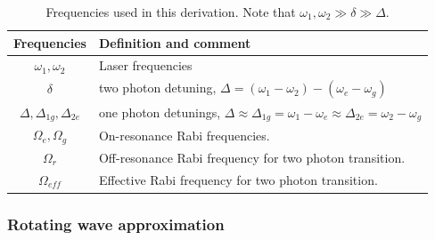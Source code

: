 \begin{table}[h!]
\centering
\begin{tabular}{|c|l|}
\hline
Frequencies & Definition and comment \\ \hline \hline
$\omega_1,\omega_2$& Laser frequencies\\ \hline
$\delta$ & two photon detuning, $\Delta=(\omega_1-\omega_2)-(\omega_e-\omega_g)$\\ \hline
$\Delta,\Delta_{1g},\Delta_{2e}$& one photon detunings, $\Delta\approx\Delta_{1g}=\omega_1-\omega_e\approx
\Delta_{2e}=\omega_2-\omega_g$\\ \hline
$\Omega_{e},\Omega_{g}$ & On-resonance Rabi frequencies. \\ \hline
$\Omega_{r}$ & Off-resonance Rabi frequency for two photon transition.\\ \hline
$\Omega_{\mathit{eff}}$ & Effective Rabi frequency for two photon transition.\\ \hline
\end{tabular}
\caption{Frequencies used in this derivation. Note that $\omega_1,\omega_2\gg \delta \gg \Delta$. }
\label{frequencyTable}
\end{table}

\subsubsection{Rotating wave approximation}

